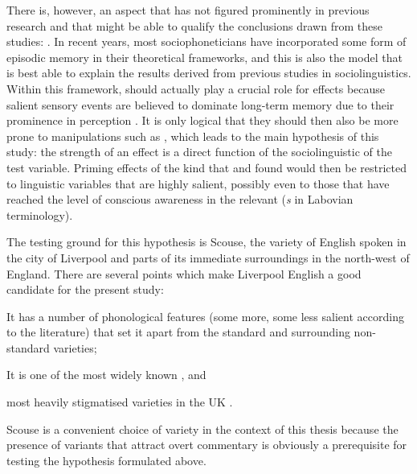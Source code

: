 There is, however, an aspect that has not figured prominently in previous research and that might be able to qualify the conclusions drawn from these studies: .
In recent years, most sociophoneticians have incorporated some form of episodic memory in their theoretical frameworks, and this is also the model that is best able to explain the results derived from previous  studies in sociolinguistics.
Within this framework,  should actually play a crucial role for  effects because salient sensory events are believed to dominate long-term memory due to their prominence in perception \parencite[cf.][]{pierrehumbert2006}.
It is only logical that they should then also be more prone to manipulations such as , which leads to the main hypothesis of this study: the strength of an   effect is a direct function of the sociolinguistic  of the test variable.
Priming effects of the kind that \textcite{niedzielski1999} and \textcite{hayetal2006a} found would then be restricted to linguistic variables that are highly salient, possibly even to those that have reached the level of conscious awareness in the relevant  (\emph{s} in Labovian terminology).

The testing ground for this hypothesis is Scouse, the variety of English spoken in the city of Liverpool and parts of its immediate surroundings in the north-west of England.
There are several points which make Liverpool English a good candidate for the present study:
\begin{inparaenum}[(1)]
	\item It has a number of phonological features (some more, some less salient according to the literature) that set it apart from the standard and surrounding non-standard varieties;
	\item It is one of the most widely known \parencite[cf.][]{trudgill1999}, and
	\item most heavily stigmatised varieties in the UK \parencite[cf.][]{montgomery2007}.
\end{inparaenum}
Scouse is a convenient choice of variety in the context of this thesis because the presence of variants that attract overt commentary is obviously a prerequisite for testing the hypothesis formulated above.

